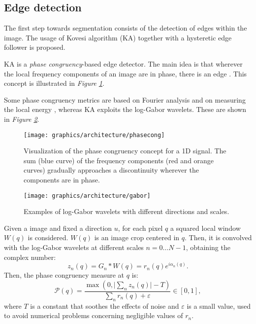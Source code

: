     \subsection{Edge detection}\label{subsection:contour_detection}
        \par{
            The first step towards segmentation consists of the detection of edges within the image. The usage of Kovesi algorithm (KA) \cite{mit:kovesiphase, googlescholar:kovesiphase} together with a hysteretic edge follower \cite{Klette:2014:CCV:2584519} is proposed.
        }
        \par{
            KA is a \emph{phase congruency}-based edge detector. The main idea is that wherever the local frequency components of an image are in phase, there is an edge \cite{researchgate:morrone}. This concept is illustrated in \emph{Figure \ref{fig:phase-congruency}}.
        }
        \par{
            Some phase congruency metrics are based on Fourier analysis and on measuring the local energy \cite{researchgate:phase}, whereas KA exploits the log-Gabor wavelets. These are shown in \emph{Figure \ref{fig:gabor}}.
        }
    	\begin{figure}
    		\centering
    		\texttt{[image: graphics/architecture/phasecong]}
    		\caption{Visualization of the phase congruency concept for a 1D signal. The sum (blue curve) of the frequency components (red and orange curves) gradually approaches a discontinuity wherever the components are in phase.}
    		\label{fig:phase-congruency}
    	\end{figure}
    	\begin{figure}
    		\centering
    		\texttt{[image: graphics/architecture/gabor]}
    		\caption{Examples of log-Gabor wavelets with different directions and scales.}
    		\label{fig:gabor}
    	\end{figure}
		\par{
			Given a image and fixed a direction $u$, for each pixel $q$ a squared local window $W(q)$ is considered. $W(q)$ is an image crop centered in $q$. Then, it is convolved with the log-Gabor wavelets at different scales $n = 0 \dots N-1$, obtaining the complex number:
	    	\begin{equation*}
	    		z_{n} (q) = G_{n} * W(q) = r_{n} (q) e^{i \alpha_{n} (q)}.
	    	\end{equation*}
	    	Then, the phase congruency measure at $q$ is:
            \begin{equation*}
	            \mathcal{P} (q) = \frac{\max(0,\lvert \sum_{n} z_{n} (q) \rvert - T)}{\sum_{n} r_{n} (q) + \varepsilon} \in \left[0,1\right],
            \end{equation*}
            where $T$ is a constant that soothes the effects of noise and $\varepsilon$ is a small value, used to avoid numerical problems concerning negligible values of $r_n$. 
        }
